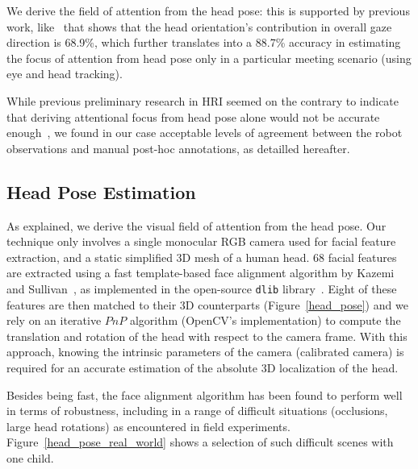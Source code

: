 \documentclass{sig-alternate}
\begin{document}
We derive the field of attention from the head pose: this is supported by
previous work, like~\cite{stiefelhagen2002tracking} that shows that the head
orientation's contribution in overall gaze direction is 68.9\%, which further
translates into a 88.7\% accuracy in estimating the focus of attention from head
pose only in a particular meeting scenario (using eye and head tracking).

While previous preliminary research in HRI seemed on the contrary to indicate
that deriving attentional focus from head pose alone would not be accurate
enough~\cite{kennedy2015head}, we found in our case acceptable levels of
agreement between the robot observations and manual post-hoc annotations, as
detailled hereafter.

\subsection{Head Pose Estimation}

As explained, we derive the visual field of attention from the head pose. Our
technique only involves a single monocular RGB camera used for facial feature
extraction, and a static simplified 3D mesh of a human head.  68 facial features
are extracted using a fast template-based face alignment algorithm by Kazemi and
Sullivan~\cite{kazemi2014one}, as implemented in the open-source {\tt dlib}
library~\cite{dlib09}.  Eight of these features are then matched to their 3D
counterparts (Figure~\ref{head_pose}) and we rely on an iterative $PnP$
algorithm (OpenCV's implementation) to compute the translation and rotation of
the head with respect to the camera frame. With this approach, knowing the
intrinsic parameters of the camera (calibrated camera) is required for an
accurate estimation of the absolute 3D localization of the head.

Besides being fast, the face alignment algorithm has been found to perform well
in terms of robustness, including in a range of difficult situations
(occlusions, large head rotations) as encountered in field experiments.
Figure~\ref{head_pose_real_world} shows a selection of such difficult scenes
with one child.
\end{document}
